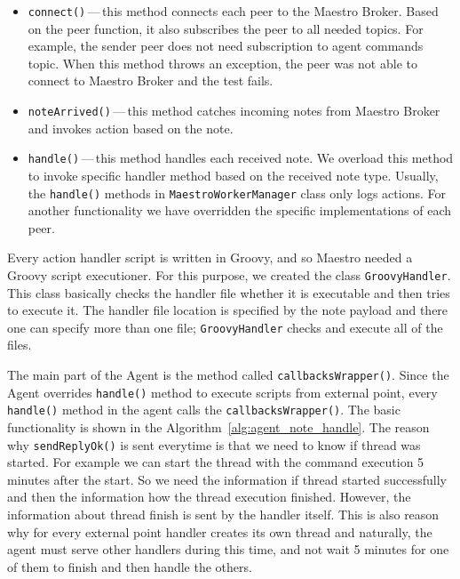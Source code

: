 \begin{itemize}
	\setlength\itemsep{0em}
	\item \texttt{connect()}\,---\,this method connects each peer to the Maestro Broker. Based on the peer function, it also subscribes the peer to all needed topics. For example, the sender peer does not need subscription to agent commands topic. When this method throws an exception, the peer was not able to connect to Maestro Broker and the test fails.
	\item \texttt{noteArrived()}\,---\,this method catches incoming notes from Maestro Broker and invokes action based on the note.
	\item \texttt{handle()}\,---\,this method handles each received note. We overload this method to invoke specific handler method based on the received note type. Usually, the \texttt{handle()} methods in \texttt{MaestroWorkerManager} class only logs actions. For another functionality we have overridden the specific implementations of each peer.
\end{itemize}

Every action handler script is written in Groovy, and so Maestro needed a Groovy script executioner. For this purpose, we created the class \texttt{GroovyHandler}. This class basically checks the handler file whether it is executable and then tries to execute it. The handler file location is specified by the note payload and there one can specify more than one file; \texttt{GroovyHandler} checks and execute all of the files.

The main part of the Agent is the method called \texttt{callbacksWrapper()}. Since the Agent overrides \texttt{handle()} method to execute scripts from external point, every \texttt{handle()} method in the agent calls the \texttt{callbacksWrapper()}. The basic functionality is shown in the Algorithm~\ref{alg:agent_note_handle}. The reason why \texttt{sendReplyOk()} is sent everytime is that we need to know if thread was started. For example we can start the thread with the command execution 5 minutes after the start. So we need the information if thread started successfully and then the information how the thread execution finished. However, the information about thread finish is sent by the handler itself. This is also reason why for every external point handler creates its own thread and naturally, the agent must serve other handlers during this time, and not wait 5 minutes for one of them to finish and then handle the others.

